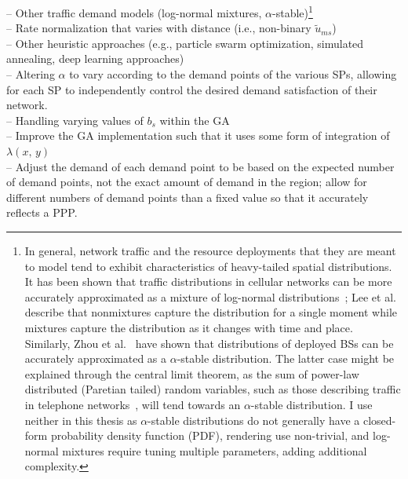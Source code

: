 \documentclass[12pt,dvipsnames]{report}
\begin{document}
\noindent -- Other traffic demand models (log-normal mixtures, $\alpha$-stable)\footnote{In general, network traffic and the resource deployments that they are meant to model tend to exhibit characteristics of heavy-tailed spatial distributions.  It has been shown that traffic distributions in cellular networks can be more accurately approximated as a mixture of log-normal distributions~\cite{5936263, 6757900}; Lee et al.~\cite{6757900} describe that nonmixtures capture the distribution for a single moment while mixtures capture the distribution as it changes with time and place.  Similarly, Zhou et al.~\cite{7202841} have shown that distributions of deployed BSs can be accurately approximated as a $\alpha$-stable distribution.  The latter case might be explained through the central limit theorem, as the sum of power-law distributed (Paretian tailed) random variables, such as those describing traffic in telephone networks~\cite{PhysRevE.72.026116}, will tend towards an $\alpha$-stable distribution.  I use neither in this thesis as $\alpha$-stable distributions do not generally have a closed-form probability density function (PDF), rendering use non-trivial, and log-normal mixtures require tuning multiple parameters, adding additional complexity.}\\%
-- Rate normalization that varies with distance (i.e., non-binary $\tilde{u}_{ms}$)\\%
-- Other heuristic approaches (e.g., particle swarm optimization, simulated annealing, deep learning approaches)\\%
--  Altering $\alpha$ to vary according to the demand points of the various SPs, allowing for each SP to independently control the desired demand satisfaction of their network.\\%
-- Handling varying values of $b_s$ within the GA\\%
-- Improve the GA implementation such that it uses some form of integration of $\lambda\left( x,\, y \right)$\\%
-- Adjust the demand of each demand point to be based on the expected number of demand points, not the exact amount of demand in the region; allow for different numbers of demand points than a fixed value so that it accurately reflects a PPP.
\fi
\end{document}
